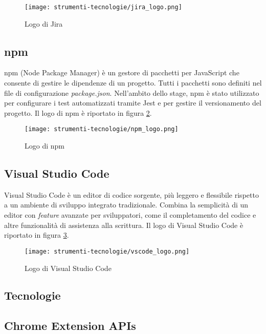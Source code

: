 \begin{figure}[H]
  \centering 
  \texttt{[image: strumenti-tecnologie/jira\_logo.png]} 
  \caption{Logo di Jira}
  \label{fig:logo_jira}
\end{figure}

\subsection*{npm}

npm (Node Package Manager) è un gestore di pacchetti per JavaScript che consente di gestire le dipendenze di un progetto. Tutti i pacchetti sono definiti nel file di configurazione \textit{package.json}. Nell’ambito dello stage, npm è stato utilizzato per configurare i test automatizzati tramite Jest e per gestire il versionamento del progetto. Il logo di npm è riportato in figura \ref{fig:logo_npm}.

\begin{figure}[H]
  \centering 
  \texttt{[image: strumenti-tecnologie/npm\_logo.png]}
  \caption{Logo di npm}
  \label{fig:logo_npm} 
\end{figure}

\subsection*{Visual Studio Code}

Visual Studio Code è un editor di codice sorgente, più leggero e flessibile rispetto a un ambiente di sviluppo integrato tradizionale. Combina la semplicità di un editor con \textit{feature} avanzate per sviluppatori, come il completamento del codice e altre funzionalità di assistenza alla scrittura. Il logo di Visual Studio Code è riportato in figura \ref{fig:logo_vscode}.

\begin{figure}[H]
  \centering 
  \texttt{[image: strumenti-tecnologie/vscode\_logo.png]} 
  \caption{Logo di Visual Studio Code}
  \label{fig:logo_vscode} 
\end{figure}

\subsection{Tecnologie}

\subsection*{Chrome Extension APIs}


